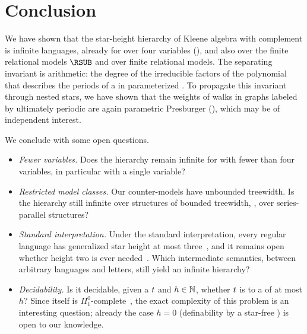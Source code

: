 \section{Conclusion}\label{section: conclusion}

We have shown that the star-height hierarchy of Kleene algebra with complement is infinite  languages, already for  over four variables (), and also over the finite relational models $\RSUB$ and over finite relational models.
The separating invariant is arithmetic: the degree of the irreducible factors of the polynomial that describes the periods of a  in parameterized .
To propagate this invariant through nested stars, we have shown that the weights of walks in graphs labeled by ultimately periodic  are again parametric Presburger (), which may be of independent interest.

We conclude with some open questions.
\begin{itemize}
    \item \emph{Fewer variables.} Does the hierarchy remain infinite for  with fewer than four variables, in particular with a single variable?
    \item \emph{Restricted model classes.} Our counter-models have unbounded treewidth. Is the hierarchy still infinite over structures of bounded treewidth, \eg, over series-parallel structures?
    \item \emph{Standard interpretation.} Under the standard interpretation, every regular language has generalized star height at most three~\cite{openaiGeneralizedStarHeight2026}, and it remains open whether height two is ever needed~\cite{pinResultsGeneralizedStarheight1992}. Which intermediate semantics, between arbitrary languages and letters, still yield an infinite hierarchy?
    \item \emph{Decidability.} Is it decidable, given a  $\term$ and $h \in \mathbb{N}$, whether $\term$ is  to a  of  at most $h$? Since  itself is $\Pi^{0}_{1}$-complete~\cite{nakamuraFiniteRelationalSemantics2025}, the exact complexity of this problem is an interesting question; already the case $h = 0$ (definability by a star-free ) is open to our knowledge.
\end{itemize}
